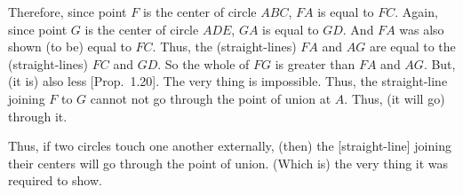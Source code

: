 \begin{Parallel}{}{}
{Therefore, since point $F$ is the center of circle $ABC$, $FA$ is equal to $FC$.
Again, since point $G$ is the center of circle $ADE$, $GA$ is equal to $GD$.
And $FA$ was also shown (to be)  equal to $FC$. Thus, the (straight-lines)
$FA$ and $AG$ are equal to the (straight-lines) $FC$ and $GD$. So the whole
of $FG$ is greater than $FA$ and $AG$. But, (it is) also less [Prop.~1.20].
The very thing is impossible. Thus, the straight-line joining $F$ to $G$
cannot not go through the point of union at $A$. Thus, (it will go) through it.

Thus, if two circles touch one another externally, (then) the [straight-line]
joining their centers will go through the point of union. (Which is)
the very thing it was required to show.}
\end{Parallel}

